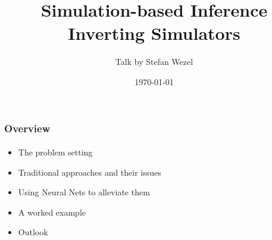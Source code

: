\documentclass[9pt]{beamer}
\title{Simulation-based Inference \\
	\small Inverting Simulators}
\author{Talk by Stefan Wezel}
\institute{mlcolab @ Tübingen University Cluster of Excellence}
\date{\today}
\begin{document}
	

\begin{frame}[plain]
	\titlepage
\end{frame} 



\begin{frame}
\frametitle{Overview}
\framesubtitle{}
\begin{itemize}
	\item The problem setting %
	\item Traditional approaches and their issues
	\item Using Neural Nets to alleviate them
	\item A worked example
	\item Outlook %
\end{itemize}
\end{frame} 
\end{document}
